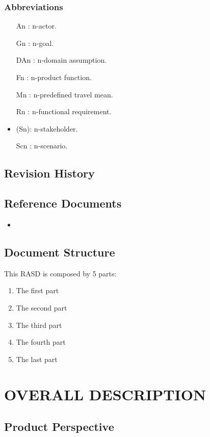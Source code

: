 \documentclass[a4paper,leqno]{book}
\begin{document}
\subsection{Abbreviations}
\begin{itemize}
	\item [An]: n-actor.
	\item [Gn]: n-goal.
	\item [DAn]: n-domain assumption.
	\item [Fn]: n-product function.
	\item [Mn]: n-predefined travel mean.
	\item [Rn]: n-functional requirement.
	\item (Sn): n-stakeholder.
	\item [Scn]: n-scenario.
\end{itemize}

\section{Revision History}

\section{Reference Documents}
\begin{itemize}
	\item 
\end{itemize}

\section{Document Structure}
This RASD is composed by 5 parts:
\begin{enumerate}
	\item The first part
	\item The second part
	\item The third part
	\item  The fourth part
	\item  The last part
\end{enumerate}

\chapter{OVERALL DESCRIPTION}
\section{Product Perspective}
\end{document}
